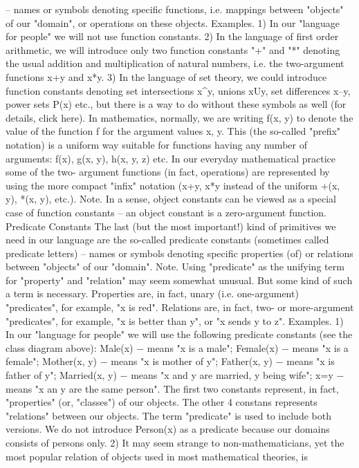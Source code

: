 – names or symbols denoting specific functions, i.e. mappings between "objects" of our "domain", or
operations on these objects.
Examples. 1) In our "language for people" we will not use function constants.
2) In the language of first order arithmetic, we will introduce only two function constants "+" and "*" denoting the usual
addition and multiplication of natural numbers, i.e. the two-argument functions x+y and x*y.
3) In the language of set theory, we could introduce function constants denoting set intersections x^y, unions xUy, set
differences x–y, power sets P(x) etc., but there is a way to do without these symbols as well (for details, click here).
In mathematics, normally, we are writing f(x, y) to denote the value of the function f for the argument
values x, y. This (the so-called "prefix" notation) is a uniform way suitable for functions having any
number of arguments: f(x), g(x, y), h(x, y, z) etc. In our everyday mathematical practice some of the two-
argument functions (in fact, operations) are represented by using the more compact "infix" notation (x+y,
x*y instead of the uniform +(x, y), *(x, y), etc.).
Note. In a sense, object constants can be viewed as a special case of function constants – an object
constant is a zero-argument function.
Predicate Constants
The last (but the most important!) kind of primitives we need in our language are the so-called predicate
constants (sometimes called predicate letters) – names or symbols denoting specific properties (of) or
relations between "objects" of our "domain".
Note. Using "predicate" as the unifying term for "property" and "relation" may seem somewhat unusual.
But some kind of such a term is necessary. Properties are, in fact, unary (i.e. one-argument) "predicates",
for example, "x is red". Relations are, in fact, two- or more-argument "predicates", for example, "x is
better than y", or "x sends y to z".
Examples. 1) In our "language for people" we will use the following predicate constants (see the class diagram above):
Male(x) − means "x is a male";
Female(x) − means "x is a female";
Mother(x, y) − means "x is mother of y";
Father(x, y) − means "x is father of y";
Married(x, y) − means "x and y are married, y being wife";
x=y − means "x an y are the same person".
The first two constants represent, in fact, "properties" (or, "classes") of our objects. The other 4 constans represents "relations"
between our objects. The term "predicate" is used to include both versions. We do not introduce Person(x) as a predicate
because our domains consists of persons only.
2) It may seem strange to non-mathematicians, yet the most popular relation of objects used in most mathematical theories, is
